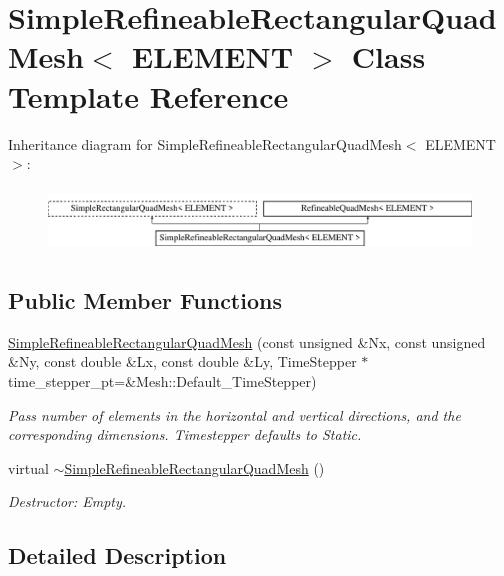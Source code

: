 \hypertarget{classSimpleRefineableRectangularQuadMesh}{}\section{Simple\+Refineable\+Rectangular\+Quad\+Mesh$<$ E\+L\+E\+M\+E\+NT $>$ Class Template Reference}
\label{classSimpleRefineableRectangularQuadMesh}
Inheritance diagram for Simple\+Refineable\+Rectangular\+Quad\+Mesh$<$ E\+L\+E\+M\+E\+NT $>$\+:\begin{figure}[H]
\begin{center}
\leavevmode
\includegraphics[height=1.702128cm]{classSimpleRefineableRectangularQuadMesh}
\end{center}
\end{figure}
\subsection*{Public Member Functions}
\begin{DoxyCompactItemize}
\item 
\hyperlink{classSimpleRefineableRectangularQuadMesh_ae0eab85a2c97fce00d7c82a613378e79}{Simple\+Refineable\+Rectangular\+Quad\+Mesh} (const unsigned \&Nx, const unsigned \&Ny, const double \&Lx, const double \&Ly, Time\+Stepper $\ast$time\+\_\+stepper\+\_\+pt=\&Mesh\+::\+Default\+\_\+\+Time\+Stepper)
\begin{DoxyCompactList}\small\item\em Pass number of elements in the horizontal and vertical directions, and the corresponding dimensions. Timestepper defaults to Static. \end{DoxyCompactList}\item 
virtual \hyperlink{classSimpleRefineableRectangularQuadMesh_a8f258e0b5178ccb33f0596ae5a33c3c5}{$\sim$\+Simple\+Refineable\+Rectangular\+Quad\+Mesh} ()
\begin{DoxyCompactList}\small\item\em Destructor\+: Empty. \end{DoxyCompactList}\end{DoxyCompactItemize}


\subsection{Detailed Description}
